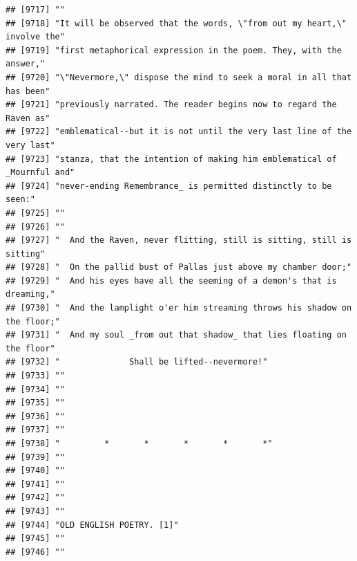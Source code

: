 \documentclass{article}\usepackage[]{graphicx}\usepackage[]{color}
\makeatletter
\newenvironment{kframe}{%
 \def\at@end@of@kframe{}%
 \ifinner\ifhmode%
  \def\at@end@of@kframe{\end{minipage}}%
  \begin{minipage}{\columnwidth}%
 \fi\fi%
 \def\FrameCommand##1{\hskip\@totalleftmargin \hskip-\fboxsep
 \colorbox{shadecolor}{##1}\hskip-\fboxsep
     \hskip-\linewidth \hskip-\@totalleftmargin \hskip\columnwidth}%
 \MakeFramed {\advance\hsize-\width
   \@totalleftmargin\z@ \linewidth\hsize
   \@setminipage}}%
 {\par\unskip\endMakeFramed%
 \at@end@of@kframe}
\newenvironment{knitrout}{}{} %
\makeatother
\begin{document}
\begin{knitrout}
\begin{kframe}
\begin{verbatim}
## [9717] ""                                                                            
## [9718] "It will be observed that the words, \"from out my heart,\" involve the"      
## [9719] "first metaphorical expression in the poem. They, with the answer,"           
## [9720] "\"Nevermore,\" dispose the mind to seek a moral in all that has been"        
## [9721] "previously narrated. The reader begins now to regard the Raven as"           
## [9722] "emblematical--but it is not until the very last line of the very last"       
## [9723] "stanza, that the intention of making him emblematical of _Mournful and"      
## [9724] "never-ending Remembrance_ is permitted distinctly to be seen:"               
## [9725] ""                                                                            
## [9726] ""                                                                            
## [9727] "  And the Raven, never flitting, still is sitting, still is sitting"         
## [9728] "  On the pallid bust of Pallas just above my chamber door;"                  
## [9729] "  And his eyes have all the seeming of a demon's that is dreaming,"          
## [9730] "  And the lamplight o'er him streaming throws his shadow on the floor;"      
## [9731] "  And my soul _from out that shadow_ that lies floating on the floor"        
## [9732] "              Shall be lifted--nevermore!"                                   
## [9733] ""                                                                            
## [9734] ""                                                                            
## [9735] ""                                                                            
## [9736] ""                                                                            
## [9737] ""                                                                            
## [9738] "         *       *       *       *       *"                                  
## [9739] ""                                                                            
## [9740] ""                                                                            
## [9741] ""                                                                            
## [9742] ""                                                                            
## [9743] ""                                                                            
## [9744] "OLD ENGLISH POETRY. [1]"                                                     
## [9745] ""                                                                            
## [9746] ""                                                                            

\end{verbatim}
\end{kframe}
\end{knitrout}
\end{document}
